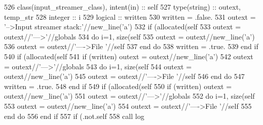 \begin{DoxyCode}
526     \textcolor{keywordtype}{class}(input\_streamer\_class), \textcolor{keywordtype}{intent(in)} :: self
527     \textcolor{keywordtype}{type}(string) :: outext, temp\_str
528     \textcolor{keywordtype}{integer} :: i
529     \textcolor{keywordtype}{logical} :: written
530     written = .false.
531     outext = \textcolor{stringliteral}{'-->Input streamer stack:'}//new\_line(\textcolor{stringliteral}{'a'})
532     \textcolor{keywordflow}{if} (\textcolor{keyword}{allocated}(self%
533         outext = outext//\textcolor{stringliteral}{'--->'}//globals%
534         \textcolor{keywordflow}{do} i=1, \textcolor{keyword}{size}(self%
535             outext = outext//new\_line(\textcolor{stringliteral}{'a'})
536             outext = outext//\textcolor{stringliteral}{'---->File '}//self%
537 \textcolor{keywordflow}{        end do}
538         written = .true.
539 \textcolor{keywordflow}{    end if}
540     \textcolor{keywordflow}{if} (\textcolor{keyword}{allocated}(self%
541         \textcolor{keywordflow}{if} (written) outext = outext//new\_line(\textcolor{stringliteral}{'a'})
542         outext = outext//\textcolor{stringliteral}{'--->'}//globals%
543         \textcolor{keywordflow}{do} i=1, \textcolor{keyword}{size}(self%
544             outext = outext//new\_line(\textcolor{stringliteral}{'a'})
545             outext = outext//\textcolor{stringliteral}{'---->File '}//self%
546 \textcolor{keywordflow}{        end do}
547         written = .true.
548 \textcolor{keywordflow}{    end if}
549     \textcolor{keywordflow}{if} (\textcolor{keyword}{allocated}(self%
550         \textcolor{keywordflow}{if} (written) outext = outext//new\_line(\textcolor{stringliteral}{'a'})
551         outext = outext//\textcolor{stringliteral}{'--->'}//globals%
552         \textcolor{keywordflow}{do} i=1, \textcolor{keyword}{size}(self%
553             outext = outext//new\_line(\textcolor{stringliteral}{'a'})
554             outext = outext//\textcolor{stringliteral}{'---->File '}//self%
555 \textcolor{keywordflow}{        end do}
556 \textcolor{keywordflow}{    end if}
557     \textcolor{keywordflow}{if} (.not.self%
558     \textcolor{keyword}{call }log%
\end{DoxyCode}
\mbox{\label{namespacesimulationinputstreamer__mod_a9465e29f527366e5f6d9a1195de6ddee}} 
